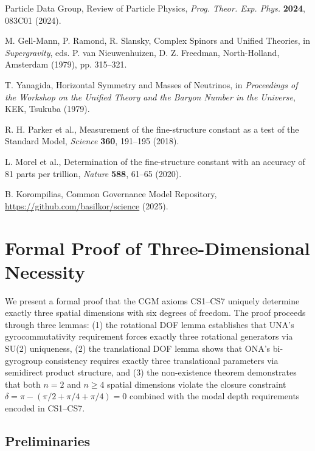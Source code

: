 \documentclass[11pt,a4paper]{article}
\theoremstyle{definition}
\theoremstyle{remark}
\begin{document}
\begin{thebibliography}{99}
Particle Data Group, Review of Particle Physics, \textit{Prog. Theor. Exp. Phys.} \textbf{2024}, 083C01 (2024).

M. Gell-Mann, P. Ramond, R. Slansky, Complex Spinors and Unified Theories, in \textit{Supergravity}, eds. P. van Nieuwenhuizen, D. Z. Freedman, North-Holland, Amsterdam (1979), pp. 315--321.

T. Yanagida, Horizontal Symmetry and Masses of Neutrinos, in \textit{Proceedings of the Workshop on the Unified Theory and the Baryon Number in the Universe}, KEK, Tsukuba (1979).

R. H. Parker et al., Measurement of the fine-structure constant as a test of the Standard Model, \textit{Science} \textbf{360}, 191--195 (2018).

L. Morel et al., Determination of the fine-structure constant with an accuracy of 81 parts per trillion, \textit{Nature} \textbf{588}, 61--65 (2020).

B. Korompilias, Common Governance Model Repository, \url{https://github.com/basilkor/science} (2025).

\end{thebibliography}

\newpage

\appendix

\section{Formal Proof of Three-Dimensional Necessity}
\label{app:3dproof}

We present a formal proof that the CGM axioms CS1--CS7 uniquely determine exactly three spatial dimensions with six degrees of freedom. The proof proceeds through three lemmas: (1) the rotational DOF lemma establishes that UNA's gyrocommutativity requirement forces exactly three rotational generators via SU(2) uniqueness, (2) the translational DOF lemma shows that ONA's bi-gyrogroup consistency requires exactly three translational parameters via semidirect product structure, and (3) the non-existence theorem demonstrates that both $n = 2$ and $n \geq 4$ spatial dimensions violate the closure constraint $\delta = \pi - (\pi/2 + \pi/4 + \pi/4) = 0$ combined with the modal depth requirements encoded in CS1--CS7.


\subsection{Preliminaries}
\end{document}
